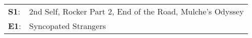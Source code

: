 \begin{supertabular}{p{0.03\textwidth}p{0.92\textwidth}}
 \textbf{S1}:  &  2nd Self\textsuperscript{}, \enspace Rocker Part 2\textsuperscript{}, \enspace End of the Road\textsuperscript{}, \enspace Mulche's Odyssey\textsuperscript{}  \enspace  \\
 \textbf{E1}:  &                                                                                                                         Syncopated Strangers\textsuperscript{}  \enspace  \\
\end{supertabular}
